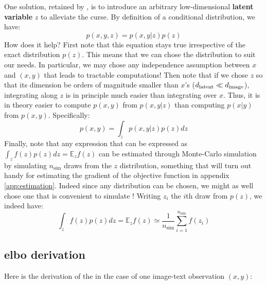 \documentclass{article}
\begin{document}
\begin{appendix}
\begin{multicols}{2}
One solution, retained by \citet{zeroshot}, is to introduce an arbitrary low-dimensional \textbf{latent variable} $z$ to alleviate the curse. By definition of a conditional distribution, we have:
$$p(x,y,z)=p(x,y | z) p(z)$$
How does it help? First note that this equation stays true irrespective of the exact distribution $p(z)$. This means that we can chose the distribution to suit our needs. In particular, we may chose any independence assumption between $x$ and $(x,y)$ that leads to tractable computations! Then note that if we chose $z$ so that its dimension be orders of magnitude smaller than $x$'s (${d_{\mathrm{latent}}}\ll d_{\mathrm{image}}$), integrating along $z$ is in principle much easier than integrating over $x$. Thus, it is in theory easier to compute $p(x,y)$ from $p(x,y | z)$ than computing $p(x|y)$ from $p(x,y)$. Specifically:
$$p(x,y)=\int_z p(x,y | z) p(z) dz$$
Finally, note that any expression that can be expressed as $\int_z f(z) p(z) dz=\mathbb{E}_z f(z)$ can be estimated through Monte-Carlo simulation by simulating $n_\text{sim}$ draws from the $z$ distribution, something that will turn out handy for estimating the gradient of the objective function in appendix \ref{app:estimation}. Indeed since any distribution can be chosen, we might as well chose one that is convenient to simulate ! Writing $z_i$ the $i$th draw from $p(z)$, we indeed have:
$$\int_z f(z) p(z) dz=\mathbb{E}_z f(z)\simeq \frac{1}{n_\text{sim}}\sum_{i=1}^{n_\text{sim}} f(z_i)$$

\end{multicols}

\subsection{\gls{elbo} derivation} \label{app:latent}

Here is the derivation of the  in the case of one image-text observation $(x,y)$:


\end{appendix}
\end{document}
